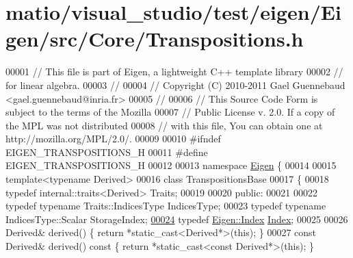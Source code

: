 \hypertarget{matio_2visual__studio_2test_2eigen_2_eigen_2src_2_core_2_transpositions_8h_source}{}\section{matio/visual\+\_\+studio/test/eigen/\+Eigen/src/\+Core/\+Transpositions.h}
\label{matio_2visual__studio_2test_2eigen_2_eigen_2src_2_core_2_transpositions_8h_source}

\begin{DoxyCode}
00001 \textcolor{comment}{// This file is part of Eigen, a lightweight C++ template library}
00002 \textcolor{comment}{// for linear algebra.}
00003 \textcolor{comment}{//}
00004 \textcolor{comment}{// Copyright (C) 2010-2011 Gael Guennebaud <gael.guennebaud@inria.fr>}
00005 \textcolor{comment}{//}
00006 \textcolor{comment}{// This Source Code Form is subject to the terms of the Mozilla}
00007 \textcolor{comment}{// Public License v. 2.0. If a copy of the MPL was not distributed}
00008 \textcolor{comment}{// with this file, You can obtain one at http://mozilla.org/MPL/2.0/.}
00009 
00010 \textcolor{preprocessor}{#ifndef EIGEN\_TRANSPOSITIONS\_H}
00011 \textcolor{preprocessor}{#define EIGEN\_TRANSPOSITIONS\_H}
00012 
00013 \textcolor{keyword}{namespace }\hyperlink{namespace_eigen}{Eigen} \{ 
00014 
00015 \textcolor{keyword}{template}<\textcolor{keyword}{typename} Derived>
00016 \textcolor{keyword}{class }TranspositionsBase
00017 \{
00018     \textcolor{keyword}{typedef} internal::traits<Derived> Traits;
00019     
00020   \textcolor{keyword}{public}:
00021 
00022     \textcolor{keyword}{typedef} \textcolor{keyword}{typename} Traits::IndicesType IndicesType;
00023     \textcolor{keyword}{typedef} \textcolor{keyword}{typename} IndicesType::Scalar StorageIndex;
\hyperlink{class_eigen_1_1_transpositions_base_a3f5f06118b419e8e6ccbe49ed5b4c91f}{00024}     \textcolor{keyword}{typedef} \hyperlink{namespace_eigen_a62e77e0933482dafde8fe197d9a2cfde}{Eigen::Index} \hyperlink{class_eigen_1_1_transpositions_base_a3f5f06118b419e8e6ccbe49ed5b4c91f}{Index}; 
00025 
00026     Derived& derived() \{ \textcolor{keywordflow}{return} *\textcolor{keyword}{static\_cast<}Derived*\textcolor{keyword}{>}(\textcolor{keyword}{this}); \}
00027     \textcolor{keyword}{const} Derived& derived()\textcolor{keyword}{ const }\{ \textcolor{keywordflow}{return} *\textcolor{keyword}{static\_cast<}\textcolor{keyword}{const }Derived*\textcolor{keyword}{>}(\textcolor{keyword}{this}); \}

\end{DoxyCode}
